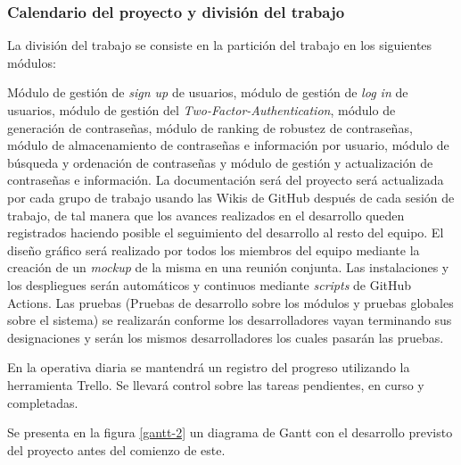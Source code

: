 \documentclass{article}
\begin{document}
\subsubsection{Calendario del proyecto y división del trabajo} \label{GANTT}

La división del trabajo se consiste en la partición del trabajo en los siguientes módulos:

Módulo de gestión de \textit{sign up} de usuarios, módulo de gestión de \textit{log in} de usuarios, módulo de gestión del \textit{Two-Factor-Authentication}, módulo de generación de contraseñas, módulo de ranking de robustez de contraseñas, módulo de almacenamiento de contraseñas e información por usuario, módulo de búsqueda y ordenación de contraseñas y módulo de gestión y actualización de contraseñas e información. La documentación será del proyecto será actualizada por cada grupo de trabajo usando las Wikis de GitHub después de cada sesión de trabajo, de tal manera que los avances realizados en el desarrollo queden registrados haciendo posible el seguimiento del desarrollo al resto del equipo. El diseño gráfico será realizado por todos los miembros del equipo mediante la creación de un \textit{mockup} de la misma en una reunión conjunta. Las instalaciones y los despliegues serán automáticos y continuos mediante \textit{scripts} de GitHub Actions. Las pruebas (Pruebas de desarrollo sobre los módulos y pruebas globales sobre el sistema) se realizarán conforme los desarrolladores vayan terminando sus designaciones y serán los mismos desarrolladores los cuales pasarán las pruebas.

En la operativa diaria se mantendrá un registro del progreso utilizando la herramienta Trello. Se llevará control sobre las tareas pendientes, en curso y completadas.

Se presenta en la figura \ref{gantt-2} un diagrama de Gantt con el desarrollo previsto del proyecto antes del comienzo de este.

\pagebreak
\end{document}
